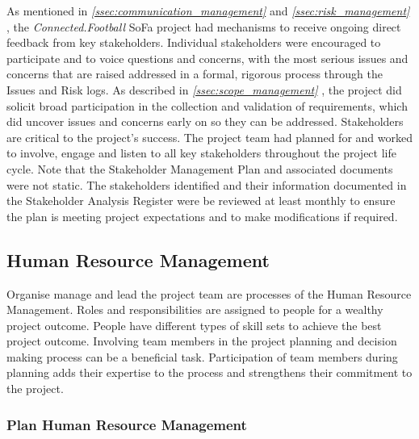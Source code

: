 As mentioned in \textit{\ref{ssec:communication_management} } and \textit{\ref{ssec:risk_management} }, the \textit{Connected.Football} SoFa project had mechanisms to receive ongoing direct feedback from key stakeholders. Individual stakeholders were encouraged to participate and to voice questions and concerns, with the most serious issues and concerns that are raised addressed in a formal, rigorous process through the Issues and Risk logs.
\newline
As described in \textit{\ref{ssec:scope_management} }, the project did solicit broad participation in the collection and validation of requirements, which did uncover issues and concerns early on so they can be addressed.
Stakeholders are critical to the project’s success. The project team had planned for and worked to involve, engage and listen to all key stakeholders throughout the project life cycle.
\newline
Note that the Stakeholder Management Plan and associated documents were not static. The stakeholders identified and their information documented in the Stakeholder Analysis Register were be reviewed at least monthly to ensure the plan is meeting project expectations and to make modifications if required.



\subsection{Human Resource Management}
\label{ssec:human_resource_management}

Organise manage and lead the project team are processes of the Human Resource Management. Roles and responsibilities are assigned to people for a wealthy project outcome. People have different types of skill sets to achieve the best project outcome. Involving team members in the project planning and decision making process can be a beneficial task. Participation of team members during planning adds their expertise to the process and strengthens their commitment to the project.

\subsubsection{Plan Human Resource Management}
\label{sssec:plan_human_resource_management}

